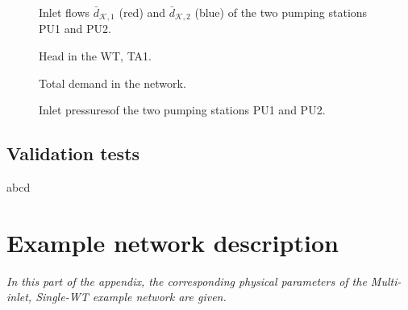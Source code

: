 \newpage


 \begin{figure}[h!]
 \centering
  
 \label{fig:inlet_flows_example1}
 \end{figure}

\vspace{-8mm}

 \begin{figure}[h!]
 \centering
 \hspace{0.15mm}
  
 \vspace{-1.5mm}
 \caption{Inlet flows $\bar{d}_{\mathcal{K},1}$ (red) and $\bar{d}_{\mathcal{K},2}$ (blue) of the two pumping stations PU1 and PU2.}
 \label{fig:inlet_flows_example1}
 \end{figure}

 

\vspace{-3mm}

 \begin{figure}[H]
 \centering
  
 \vspace{-1.5mm}
 \caption{Head in the WT, TA1.}
 \label{fig:WT_head_example}
 \end{figure}

 \vspace{-3mm}

 \begin{figure}[H]
 \centering
  
 \vspace{-1.5mm}
 \caption{Total demand in the network.}
 \label{fig:sigma_example}
 \end{figure}

 \begin{figure}[H]
 \centering
  
 \vspace{-1.5mm}
 \caption{Inlet pressuresof the two pumping stations PU1 and PU2.}
 \label{fig:sigma_example}
 \end{figure}

\section{Validation tests}
\label{validation_tests} 

abcd

\chapter{Example network description}
\label{physical_properties_example1}

\emph{In this part of the appendix, the corresponding physical parameters of the Multi-inlet, Single-WT example network are given.}




